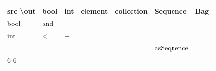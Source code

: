\begin{table}[!ht]
    \begin{tabular}{|l|l|l|l|l|l|l|}
    \hline
    src \textbackslash out       & bool                                                                                                                            & int                                                                                            & element                                                                    & collection                                                                                        & Sequence                                                                            & Bag                                                                                  \\ \hline
    bool                         & \cellcolor[HTML]{9AFF99}and                                                                                                     &                                                                                                &                                                                            &                                                                                                   &                                                                                     &                                                                                      \\ \hline
    int                          & \cellcolor[HTML]{9AFF99}\textless{}                                                                                             & \cellcolor[HTML]{9AFF99}+                                                                      &                                                                            &                                                                                                   &                                                                                     &                                                                                      \\ \hline
                                 & \cellcolor[HTML]{DAE8FC}                                                                                                        & \cellcolor[HTML]{CBCEFB}                                                                       & \cellcolor[HTML]{9698ED}                                                   & \cellcolor[HTML]{9698ED}                                                                          & \cellcolor[HTML]{96FFFB}asSequence                                                  & \cellcolor[HTML]{96FFFB}                                                             \\ \cline{6-6}

\end{tabular}
\end{table}
